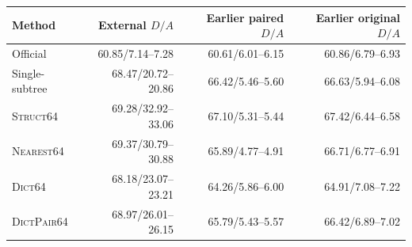 \begin{tabular}{lrrr}
\toprule
Method & External $D/A$ & Earlier paired $D/A$ & Earlier original $D/A$ \\
\midrule
Official & 60.85/7.14--7.28 & 60.61/6.01--6.15 & 60.86/6.79--6.93 \\
Single-subtree & 68.47/20.72--20.86 & 66.42/5.46--5.60 & 66.63/5.94--6.08 \\
\textsc{Struct64} & 69.28/32.92--33.06 & 67.10/5.31--5.44 & 67.42/6.44--6.58 \\
\textsc{Nearest64} & 69.37/30.79--30.88 & 65.89/4.77--4.91 & 66.71/6.77--6.91 \\
\textsc{Dict64} & 68.18/23.07--23.21 & 64.26/5.86--6.00 & 64.91/7.08--7.22 \\
\textsc{DictPair64} & 68.97/26.01--26.15 & 65.79/5.43--5.57 & 66.42/6.89--7.02 \\
\bottomrule
\end{tabular}
